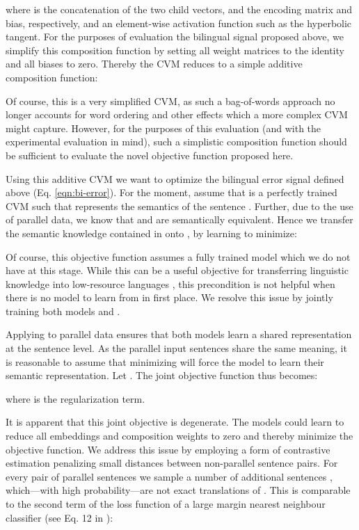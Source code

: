 \documentclass{article} \pdfoutput=1
\newcommand{\CVM}{\textsc{CVM}\xspace}
\begin{document}
where  is the concatenation of the two child vectors,  and  the encoding matrix and bias, respectively, and  an element-wise activation function such as the hyperbolic tangent.
For the purposes of evaluation the bilingual signal proposed above, we simplify this composition function by setting all weight matrices to the identity and all biases to zero.
Thereby the \CVM reduces to a simple additive composition function:

Of course, this is a very simplified \CVM, as such a bag-of-words approach no
longer accounts for word ordering and other effects which a more complex \CVM
might capture. However, for the purposes of this evaluation (and with the
experimental evaluation in mind), such a simplistic composition function should
be sufficient to evaluate the novel objective function proposed here.

Using this additive \CVM we want to optimize the bilingual error signal defined above (Eq. \ref{eqn:bi-error}).
For the moment, assume that  is a perfectly trained \CVM such that  represents the semantics of the sentence .
Further, due to the use of parallel data, we know that  and  are semantically equivalent.
Hence we transfer the semantic knowledge contained in  onto , by learning  to minimize:


Of course, this objective function assumes a fully trained model which we do not have at this stage.
While this can be a useful objective for transferring linguistic knowledge into low-resource languages \cite{Klementiev:2012}, this precondition is not helpful when there is no model to learn from in first place.
We resolve this issue by jointly training both models  and .

Applying  to parallel data ensures that both models learn a shared representation at the sentence level.
As the parallel input sentences share the same meaning, it is reasonable to assume that minimizing  will force the model to learn their semantic representation.
Let .
The joint objective function  thus becomes:

where  is the  regularization term.

It is apparent that this joint objective  is degenerate.
The models could learn to reduce all embeddings and composition weights to zero and thereby minimize the objective function.
We address this issue by employing a form of contrastive estimation penalizing small distances between non-parallel sentence pairs.
For every pair of parallel sentences  we sample a number of additional sentences , which---with high probability---are not exact translations of .
This is comparable to the second term of the loss function of a large margin nearest neighbour classifier (see Eq. 12 in \cite{Weinberger:2009}):
\end{document}
